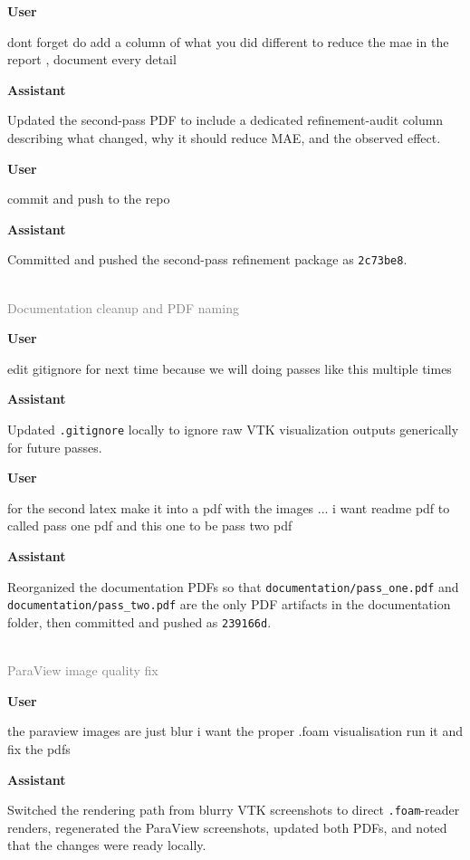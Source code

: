 \documentclass[11pt]{article}
\newcommand{\turnheader}[2]{
  \vspace{0.8em}
  \noindent{\large\textbf{#1}}\\
  \noindent\textcolor{gray}{#2}
  \vspace{0.35em}
}
\newenvironment{chatuser}
  {\par\noindent\color{userblue}\textbf{User}\par\noindent\begin{minipage}{\linewidth}\raggedright}
  {\end{minipage}\par}
\newenvironment{chatassistant}
  {\par\noindent\color{assistantgreen}\textbf{Assistant}\par\noindent\begin{minipage}{\linewidth}\raggedright}
  {\end{minipage}\par}
\begin{document}
\begin{chatuser}
dont forget do add a column of what you did different to reduce the mae in the report , document every detail
\end{chatuser}

\begin{chatassistant}
Updated the second-pass PDF to include a dedicated refinement-audit column describing what changed, why it should reduce MAE, and the observed effect.
\end{chatassistant}

\begin{chatuser}
commit and push to the repo
\end{chatuser}

\begin{chatassistant}
Committed and pushed the second-pass refinement package as \texttt{2c73be8}.
\end{chatassistant}

\turnheader{Turn 6}{Documentation cleanup and PDF naming}
\begin{chatuser}
edit gitignore for next time because we will doing passes like this multiple times
\end{chatuser}

\begin{chatassistant}
Updated \texttt{.gitignore} locally to ignore raw VTK visualization outputs generically for future passes.
\end{chatassistant}

\begin{chatuser}
for the second latex make it into a pdf with the images ... i want readme pdf to called pass one pdf and this one to be pass two pdf
\end{chatuser}

\begin{chatassistant}
Reorganized the documentation PDFs so that \texttt{documentation/pass\_one.pdf} and \texttt{documentation/pass\_two.pdf} are the only PDF artifacts in the documentation folder, then committed and pushed as \texttt{239166d}.
\end{chatassistant}

\turnheader{Turn 7}{ParaView image quality fix}
\begin{chatuser}
the paraview images are just blur i want the proper .foam visualisation run it and fix the pdfs
\end{chatuser}

\begin{chatassistant}
Switched the rendering path from blurry VTK screenshots to direct \texttt{.foam}-reader renders, regenerated the ParaView screenshots, updated both PDFs, and noted that the changes were ready locally.
\end{chatassistant}
\end{document}
